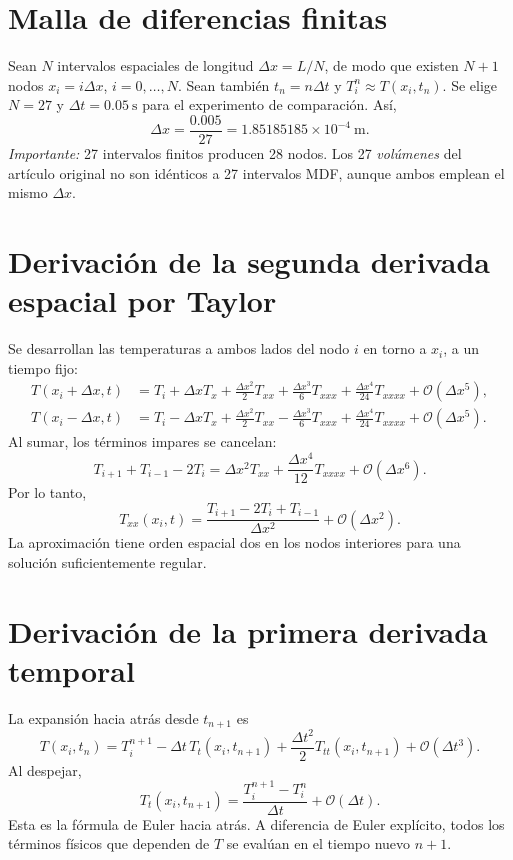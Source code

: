 \documentclass[11pt,a4paper]{article}
\newcommand{\OO}{\mathcal{O}}
\begin{document}
\section{Malla de diferencias finitas}
Sean $N$ intervalos espaciales de longitud $\Delta x=L/N$, de modo que existen $N+1$ nodos $x_i=i\Delta x$, $i=0,\dots,N$. Sean también $t_n=n\Delta t$ y $T_i^n\approx T(x_i,t_n)$. Se elige $N=27$ y $\Delta t=\SI{0.05}{\second}$ para el experimento de comparación. Así,
\begin{equation}
\Delta x=\frac{0.005}{27}=1.85185185\times10^{-4}\ \mathrm m.
\end{equation}
\textit{Importante:} 27 intervalos finitos producen 28 nodos. Los 27 \emph{volúmenes} del artículo original no son idénticos a 27 intervalos MDF, aunque ambos emplean el mismo $\Delta x$.

\section{Derivación de la segunda derivada espacial por Taylor}
Se desarrollan las temperaturas a ambos lados del nodo $i$ en torno a $x_i$, a un tiempo fijo:
\begin{align}
T(x_i+\Delta x,t)&=T_i+\Delta x T_x+\frac{\Delta x^2}{2}T_{xx}+\frac{\Delta x^3}{6}T_{xxx}+\frac{\Delta x^4}{24}T_{xxxx}+\OO(\Delta x^5),\\
T(x_i-\Delta x,t)&=T_i-\Delta x T_x+\frac{\Delta x^2}{2}T_{xx}-\frac{\Delta x^3}{6}T_{xxx}+\frac{\Delta x^4}{24}T_{xxxx}+\OO(\Delta x^5).
\end{align}
Al sumar, los términos impares se cancelan:
\begin{equation}
T_{i+1}+T_{i-1}-2T_i=\Delta x^2T_{xx}+\frac{\Delta x^4}{12}T_{xxxx}+\OO(\Delta x^6).
\end{equation}
Por lo tanto,
\begin{equation}\boxed{T_{xx}(x_i,t)=\frac{T_{i+1}-2T_i+T_{i-1}}{\Delta x^2}+\OO(\Delta x^2).}\label{eq:xx}\end{equation}
La aproximación tiene orden espacial dos en los nodos interiores para una solución suficientemente regular.

\section{Derivación de la primera derivada temporal}
La expansión hacia atrás desde $t_{n+1}$ es
\begin{equation}
T(x_i,t_n)=T_i^{n+1}-\Delta t\,T_t(x_i,t_{n+1})+\frac{\Delta t^2}{2}T_{tt}(x_i,t_{n+1})+\OO(\Delta t^3).
\end{equation}
Al despejar,
\begin{equation}\boxed{T_t(x_i,t_{n+1})=\frac{T_i^{n+1}-T_i^n}{\Delta t}+\OO(\Delta t).}\label{eq:tt}\end{equation}
Esta es la fórmula de Euler hacia atrás. A diferencia de Euler explícito, todos los términos físicos que dependen de $T$ se evalúan en el tiempo nuevo $n+1$.
\end{document}
